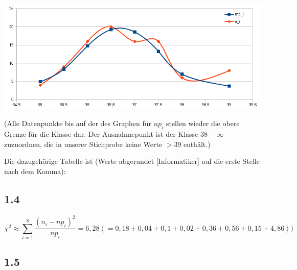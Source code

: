 \documentclass[12pt,a4paper]{article}
\begin{document}
\includegraphics[scale=0.7]{1_3_dichte_vs_data}

\tiny (Alle Datenpunkte bis auf der des Graphen für $n p_i$ stellen wieder die obere Grenze für die Klasse dar. Der Ausnahmepunkt ist der Klasse $38 - \infty$ zuzuordnen, die in unserer Stichprobe keine Werte $> 39$ enthält.)\normalsize

Die dazugehörige Tabelle ist (Werte abgerundet [Informatiker] auf die erste Stelle nach dem Komma):

\subsection*{1.4}

\[
\chi^2 \approx \sum\limits_{i=1}^8 \frac{(n_i -n p_i)^2}{n p_i} = 6,28 (= 0,18+0,04+0,1+0,02+0,36+0,56+0,15+4,86)
)
\]
\subsection*{1.5}
\end{document}
